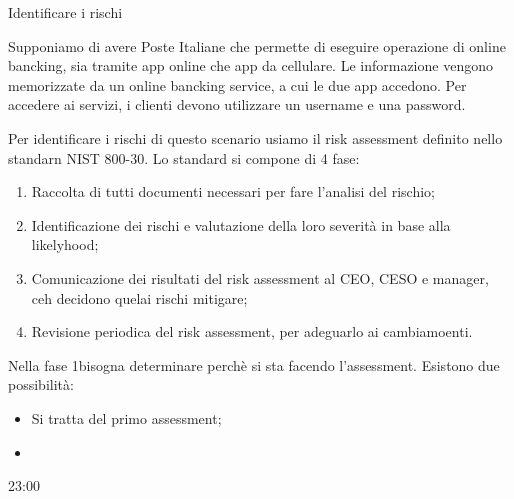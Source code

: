 Identificare i rischi

Supponiamo di avere Poste Italiane che permette di eseguire operazione di online bancking, sia tramite app online che app da cellulare. Le informazione vengono memorizzate da un online bancking service, a cui le due app accedono. Per accedere ai servizi, i clienti devono utilizzare un username e una password.

Per identificare i rischi di questo scenario usiamo il risk assessment definito nello standarn NIST 800-30. Lo standard si compone di 4 fase:
\begin{enumerate}
    \item Raccolta di tutti documenti necessari per fare l'analisi del rischio;
    \item Identificazione dei rischi e valutazione della loro severità in base alla likelyhood;
    \item Comunicazione dei risultati del risk assessment al CEO, CESO e manager, ceh decidono quelai rischi mitigare;
    \item Revisione periodica del risk assessment, per adeguarlo ai cambiamoenti.
\end{enumerate}

\noindent Nella fase 1bisogna determinare perchè si sta facendo l'assessment. Esistono due possibilità:
\begin{itemize}
    \item Si tratta del primo assessment;
    \item 
\end{itemize}

23:00

































